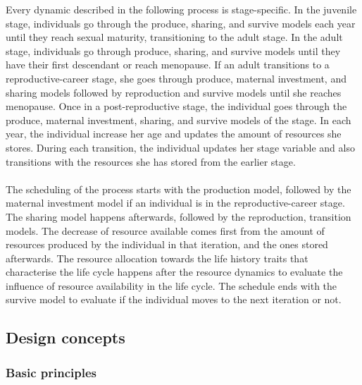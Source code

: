 \documentclass{article}
\begin{document}
Every dynamic described in the following process is stage-specific. In the juvenile stage, individuals go through the produce, sharing, and survive models each year until they reach sexual maturity, transitioning to the adult stage. In the adult stage, individuals go through produce, sharing, and survive models until they have their first descendant or reach menopause. If an adult transitions to a reproductive-career stage, she goes through produce, maternal investment, and sharing models followed by reproduction and survive models until she reaches menopause. Once in a post-reproductive stage, the individual goes through the produce, maternal investment, sharing, and survive models of the stage. In each year, the individual increase her age and updates the amount of resources she stores. During each transition, the individual updates her stage variable and also transitions with the resources she has stored from the earlier stage.
\\\\
The scheduling of the process starts with the production model, followed by the maternal investment model if an individual is in the reproductive-career stage. The sharing model happens afterwards, followed by the reproduction, transition models. The decrease of resource available comes first from the amount of resources produced by the individual in that iteration, and the ones stored afterwards. The resource allocation towards the life history traits that characterise the life cycle happens after the resource dynamics to evaluate the influence of resource availability in the life cycle. The schedule ends with the survive model to evaluate if the individual moves to the next iteration or not.

\subsection{Design concepts}

\subsubsection{Basic principles}
\end{document}
